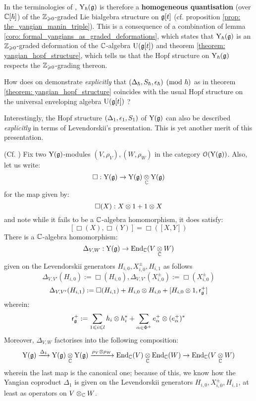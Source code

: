         \begin{remark}
            In the terminologies of \cite{wendlandt_restricted_quantum_doubles_of_yangians}, $\mathrm{Y}_{\hbar}(\mathfrak{g})$ is therefore a \textbf{homogeneous quantisation} (over $\mathbb{C}[\hbar]$) of the $\mathbb{Z}_{\geqslant 0}$-graded Lie bialgebra structure on $\mathfrak{g}[t]$ (cf. proposition \ref{prop: the_yangian_manin_triple}). This is a consequence of a combination of lemma \ref{coro: formal_yangians_as_graded_deformations}, which states that $\mathrm{Y}_{\hbar}(\mathfrak{g})$ is an $\mathbb{Z}_{\geqslant 0}$-graded deformation of the $\mathbb{C}$-algebra $\mathrm{U}(\mathfrak{g}[t])$ and theorem \ref{theorem: yangian_hopf_structure}, which tells us that the Hopf structure on $\mathrm{Y}_{\hbar}(\mathfrak{g})$ respects the $\mathbb{Z}_{\geqslant 0}$-grading thereon. 
        \end{remark}
        \begin{question}
            How does on demonstrate \textit{explicitly} that $(\Delta_{\hbar}, S_{\hbar}, \epsilon_{\hbar}) \pmod{\hbar}$ as in theorem \ref{theorem: yangian_hopf_structure} coincides with the usual Hopf structure on the universal enveloping algebra $\mathrm{U}(\mathfrak{g}[t])$ ?
        \end{question}
        Interestingly, the Hopf structure $(\Delta_1, \epsilon_1, S_1)$ of $\mathrm{Y}(\mathfrak{g})$ can also be described \textit{explicitly} in terms of Levendorskii's presentation. This is yet another merit of this presentation. 
        \begin{proposition} \label{prop: yangian_hopf_structure_via_levendorskii_presentation}
            (Cf. \cite[Definition 4.6, Theorem 4.9, and Proposition 5.18]{guay_nakajima_wendlandt_affine_yangian_coproduct}) Fix two $\mathrm{Y}(\mathfrak{g})$-modules $(V, \rho_V), (W, \rho_W)$ in the category $\mathcal{O}(\mathrm{Y}(\mathfrak{g}))$. Also, let us write:
                $$\Box: \rmY(\g) \to \rmY(\g) \tensor_{\bbC} \rmY(\g)$$
            for the map given by:
                $$\Box(X): X \tensor 1 + 1 \tensor X$$
            and note while it fails to be a $\mathbb{C}$-algebra homomorphism, it does satisfy:
                $$[ \Box(X), \Box(Y) ] = \Box( [X, Y] )$$
            There is a $\mathbb{C}$-algebra homomorphism:
                $$\Delta_{V, W}: \rmY(\g) \to \End_{\bbC}(V \tensor_{\bbC} W)$$
            given on the Levendorskii generators $H_{i, 0}, X_{i, 0}^{\pm}, H_{i, 1}$ as follows
                $$\Delta_{V, V'}(H_{i, 0}) := \Box(H_{i, 0}), \Delta_{V, V'}(X_{i, 0}^{\pm}) := \Box(X_{i, 0}^{\pm})$$
                $$\Delta_{V, V'}(H_{i, 1}) := \Box(H_{i, 1}) + H_{i, 0} \tensor H_{i, 0} + [H_{i, 0} \tensor 1, \sfr_{\g}^+]$$
            wherein:
                $$\sfr_{\g}^+ := \sum_{1 \leq i \leq l} h_i \tensor h_i^* + \sum_{\alpha \in \Phi^+} e_{\alpha}^+ \tensor ( e_{\alpha}^+ )^*$$
            Moreover, $\Delta_{V, W}$ factorises into the following composition:
                $$\rmY(\g) \xrightarrow[]{\Delta_1} \rmY(\g) \tensor_{\bbC} \rmY(\g) \xrightarrow[]{\rho_V \tensor \rho_W} \End_{\bbC}(V) \tensor_{\bbC} \End_{\bbC}(W) \to \End_{\bbC}(V \tensor_{\bbC} W)$$
            wherein the last map is the canonical one; because of this, we know how the Yangian coproduct $\Delta_1$ is given on the Levendorskii generators $H_{i, 0}, X_{i, 0}^{\pm}, H_{i, 1}$, at least as operators on $V \tensor_{\bbC} W$. 
        \end{proposition}
